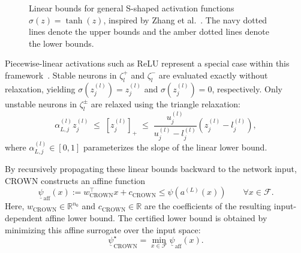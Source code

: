 \begin{figure}[htbp]
    \centering
    
    \caption[Linear relaxation for general activations]{
        Linear bounds for general S-shaped activation functions $\sigma(z) = \tanh(z)$, 
        inspired by Zhang et al.~\cite{zhangEfficientNeuralNetwork2018}. 
        The navy dotted lines denote the upper bounds and the amber dotted lines denote the lower bounds. 
    }
    \label{fig:crown-relaxations}
\end{figure}

Piecewise-linear activations such as ReLU represent a special case within this 
framework~\cite{zhangEfficientNeuralNetwork2018}. Stable neurons in $\zeta_l^+$ and $\zeta_l^-$ 
are evaluated exactly without relaxation, yielding $\sigma(z_j^{(l)}) = z_j^{(l)}$ and $\sigma(z_j^{(l)}) = 0$, respectively. 
Only unstable neurons in $\zeta_l^\pm$ are relaxed using the triangle relaxation:
\begin{equation}
    \alpha_{L,j}^{(l)} z_j^{(l)} \;\le\; \left[z_j^{(l)}\right]_+
        \;\le\; 
        \frac{u_j^{(l)}}{u_j^{(l)} - l_j^{(l)}} \left( z_j^{(l)} - l_j^{(l)} \right),
    \label{eq:crown-relu-bounds}
\end{equation}
where $\alpha_{L,j}^{(l)} \in [0, 1]$ parameterizes the slope of the linear lower bound.

By recursively propagating these linear bounds backward to the network input, CROWN constructs an affine function
\begin{equation}
    \underline{\psi}_{\mathrm{aff}}(x) := w_{\mathrm{CROWN}}^\top x + c_{\mathrm{CROWN}}
    \le
    \psi(a^{(L)}(x))
    \qquad \forall x \in \mathcal{F}.
\end{equation}
Here, $w_{\mathrm{CROWN}} \in \mathbb{R}^{n_0}$ and $c_{\mathrm{CROWN}} \in \mathbb{R}$ are the coefficients of the 
resulting input-dependent affine lower bound. 
The certified lower bound is obtained by minimizing this affine surrogate over the input space:
\begin{equation}
    \underline{\psi}_{\mathrm{CROWN}}^\star = \min_{x \in \mathcal{F}} \underline{\psi}_{\mathrm{aff}}(x).
    \label{eq:crown-closed-form}
\end{equation}



